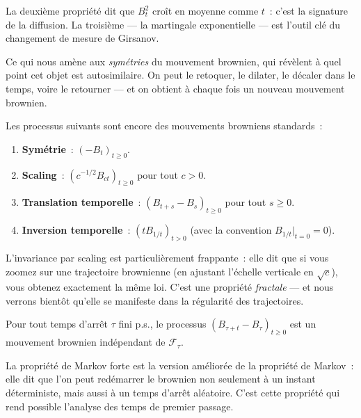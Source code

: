 La deuxi\`eme propri\'et\'e dit que $B_t^2$ cro\^it en moyenne comme $t$~: c'est
la signature de la diffusion. La troisi\`eme --- la martingale exponentielle
--- est l'outil cl\'e du changement de mesure de Girsanov.

Ce qui nous am\`ene aux \emph{sym\'etries} du mouvement brownien, qui r\'ev\`elent
\`a quel point cet objet est \og autosimilaire\fg. On peut le retoquer, le
dilater, le d\'ecaler dans le temps, voire le retourner --- et on obtient
\`a chaque fois un nouveau mouvement brownien.

\begin{proposition}
\label{prop:invariance}
Les processus suivants sont encore des mouvements browniens standards~:
\begin{enumerate}
  \item \textbf{Sym\'etrie}~: $(-B_t)_{t \geq 0}$.
  \item \textbf{Scaling}~: $(c^{-1/2} B_{ct})_{t \geq 0}$ pour tout $c > 0$.
  \item \textbf{Translation temporelle}~: $(B_{t+s} - B_s)_{t \geq 0}$ pour tout $s \geq 0$.
  \item \textbf{Inversion temporelle}~: $(tB_{1/t})_{t > 0}$ (avec la convention
    $B_{1/t}\big|_{t=0} = 0$).
\end{enumerate}
\end{proposition}

L'invariance par scaling est particuli\`erement frappante~: elle dit que si
vous zoomez sur une trajectoire brownienne (en ajustant l'\'echelle
verticale en $\sqrt{c}$), vous obtenez exactement la m\^eme loi.
C'est une propri\'et\'e \emph{fractale} --- et nous verrons bient\^ot qu'elle
se manifeste dans la r\'egularit\'e des trajectoires.

\begin{proposition}
Pour tout temps d'arr\^et $\tau$ fini p.s., le processus
$(B_{\tau + t} - B_{\tau})_{t \geq 0}$ est un mouvement brownien ind\'ependant
de $\mathcal{F}_{\tau}$.
\end{proposition}

La propri\'et\'e de Markov forte est la version \og am\'elior\'ee\fg{} de la propri\'et\'e
de Markov~: elle dit que l'on peut red\'emarrer le brownien non seulement \`a
un instant d\'eterministe, mais aussi \`a un temps d'arr\^et al\'eatoire. C'est
cette propri\'et\'e qui rend possible l'analyse des temps de premier passage.


